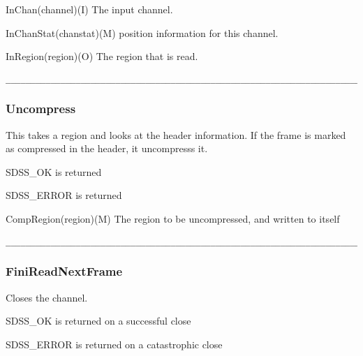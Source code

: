 \begin{arguments}
\item{InChan}(channel)(I) The input channel.
\item{InChanStat}(chanstat)(M) position information for this channel.
\item{InRegion}(region)(O) The region that is read.
\end{arguments}

\begin{verbatim}
__________________________________________________________________________
\end{verbatim}

\subsubsection{Uncompress}

\begin{descrip}
This takes a region and looks at the header information.  If the frame is
marked as compressed in the header, it uncompresss it.
\end{descrip}

\begin{returnval}
\item{SDSS\_OK} is returned 
\item{SDSS\_ERROR} is returned 
\end{returnval}

\begin{arguments}
\item{CompRegion}(region)(M) The region to be uncompressed, and written to 
itself
\end{arguments}

\begin{verbatim}
__________________________________________________________________________
\end{verbatim}

\subsubsection{FiniReadNextFrame}

\begin{descrip}
Closes the channel.  
\end{descrip}

\begin{returnval}
\item{SDSS\_OK} is returned on a successful close
\item{SDSS\_ERROR} is returned on a catastrophic close
\end{returnval}

